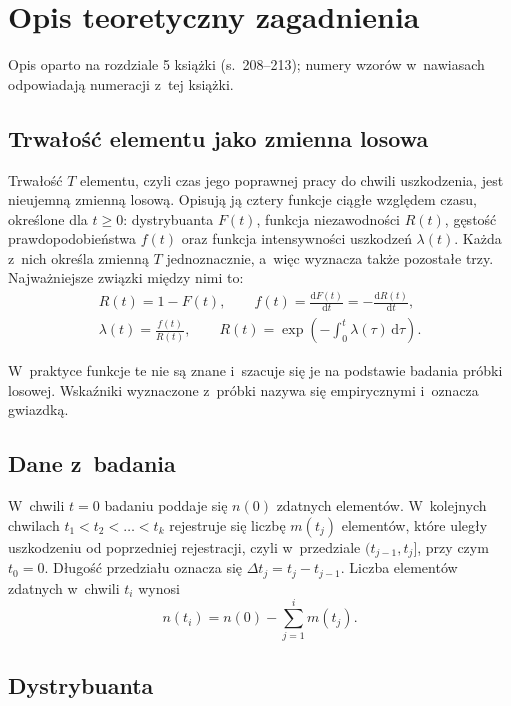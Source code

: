 \section{Opis teoretyczny zagadnienia}

Opis oparto na rozdziale 5 książki \cite{prazewska} (s.~208--213); numery wzorów
w~nawiasach odpowiadają numeracji z~tej książki.

\subsection{Trwałość elementu jako zmienna losowa}

Trwałość $T$ elementu, czyli czas jego poprawnej pracy do chwili uszkodzenia, jest
nieujemną zmienną losową. Opisują ją cztery funkcje ciągłe względem czasu, określone
dla $t \geq 0$: dystrybuanta $F(t)$, funkcja niezawodności $R(t)$, gęstość
prawdopodobieństwa $f(t)$ oraz funkcja intensywności uszkodzeń $\lambda(t)$. Każda
z~nich określa zmienną $T$ jednoznacznie, a~więc wyznacza także pozostałe trzy.
Najważniejsze związki między nimi to:
\begin{gather*}
  R(t) = 1 - F(t), \qquad
  f(t) = \frac{\mathrm{d}F(t)}{\mathrm{d}t} = -\frac{\mathrm{d}R(t)}{\mathrm{d}t}, \\[4pt]
  \lambda(t) = \frac{f(t)}{R(t)}, \qquad
  R(t) = \exp\!\left(-\int_0^t \lambda(\tau)\,\mathrm{d}\tau\right).
\end{gather*}

W~praktyce funkcje te nie są znane i~szacuje się je na podstawie badania próbki
losowej. Wskaźniki wyznaczone z~próbki nazywa się empirycznymi i~oznacza gwiazdką.

\subsection{Dane z~badania}

W~chwili $t = 0$ badaniu poddaje się $n(0)$ zdatnych elementów. W~kolejnych chwilach
$t_1 < t_2 < \dots < t_k$ rejestruje się liczbę $m(t_j)$ elementów, które uległy
uszkodzeniu od poprzedniej rejestracji, czyli w~przedziale $(t_{j-1}, t_j]$, przy
czym $t_0 = 0$. Długość przedziału oznacza się $\Delta t_j = t_j - t_{j-1}$. Liczba
elementów zdatnych w~chwili $t_i$ wynosi
\begin{equation*}
  n(t_i) = n(0) - \sum_{j=1}^{i} m(t_j).
\end{equation*}

\subsection{Dystrybuanta}


